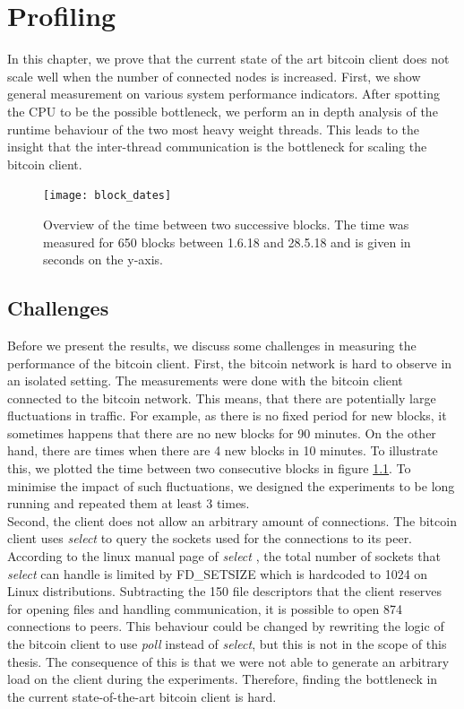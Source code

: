 \chapter{\label{profiling}Profiling}
In this chapter, we prove that the current state of the art bitcoin client does not scale well when the number of connected nodes is increased. First, we show general measurement on various system performance indicators. After spotting the CPU to be the possible bottleneck, we perform an in depth analysis of the runtime behaviour of the two most heavy weight threads. This leads to the insight that the inter-thread communication is the bottleneck for scaling the bitcoin client.

\begin{figure}[!hbt]
\begin{center}
\texttt{[image: block\_dates]}
\caption[Overview of the time between two successive bitcoin blocks.]{Overview of the time between two successive blocks. The time was measured for 650 blocks between 1.6.18 and 28.5.18 and is given in seconds on the y-axis. \label{figure:blockDates}}
\end{center}
\end{figure}

\section{Challenges \label{sec:measuringDifficutlies}}
Before we present the results, we discuss some challenges in measuring the performance of the bitcoin client. First, the bitcoin network is hard to observe in an isolated setting. The measurements were done with the bitcoin client connected to the bitcoin network. This means, that there are potentially large fluctuations in traffic. For example, as there is no fixed period for new blocks, it sometimes happens that there are no new blocks for 90 minutes. On the other hand, there are times when there are 4 new blocks in 10 minutes. To illustrate this, we plotted the time between two consecutive blocks in figure \ref{figure:blockDates}. To minimise the impact of such fluctuations, we designed the experiments to be long running and repeated them at least 3 times.\\
Second, the client does not allow an arbitrary amount of connections. The bitcoin client uses \textit{select} to query the sockets used for the connections to its peer. According to the linux manual page of \textit{select} \cite{select}, the total number of sockets that \textit{select} can handle is limited by FD\_SETSIZE which is hardcoded to 1024 on Linux distributions. Subtracting the 150 file descriptors that the client reserves for opening files and handling communication, it is possible to open 874 connections to peers. This behaviour could be changed by rewriting the logic of the bitcoin client to use \textit{poll} instead of \textit{select}, but this is not in the scope of this thesis. The consequence of this is that we were not able to generate an arbitrary load on the client during the experiments. Therefore, finding the bottleneck in the current state-of-the-art bitcoin client is hard.


